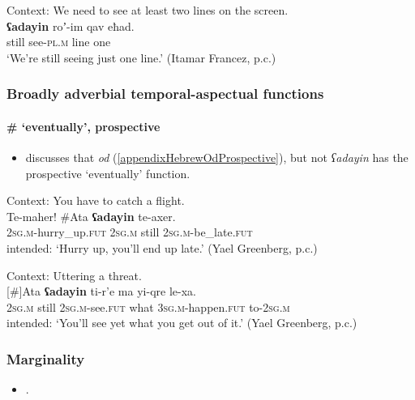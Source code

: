 \begin{exe}
	\ex\label{appendixHebrewAdayinScalar5}
	 Context: We need to see at least two lines on the screen.\\
	 \gll \textbf{ʕadayin} roʼ-im qav eħad.\\
	 still see-\textsc{pl}.\textsc{m} line one\\
	 \glt \lq We're still seeing just one line.\rq{ }(Itamar Francez, p.c.)
\end{exe}


\subsubsection{Broadly adverbial temporal-aspectual functions}
\paragraph{\# \lq eventually', prospective}

\begin{itemize}
	\item \textcite[141]{Koenig1991} discusses that \textit{od} (\ref{appendixHebrewOdProspective}), but not \textit{ʕadayin} has the prospective \lq eventually\rq{ }function. 
\end{itemize}

\begin{exe}
	\ex Context: You have to catch a flight.\\
	\gll Te-maher! \#Ata \textbf{ʕadayin} te-axer.\\
	2\textsc{sg}.\textsc{m}-hurry\_up.\textsc{fut} \phantom{\#}2\textsc{sg}.\textsc{m} still 2\textsc{sg}.\textsc{m}-be\_late.\textsc{fut}\\
	\glt intended: \lq Hurry up, you’ll end up late.' (Yael Greenberg, p.c.)
	
	\ex Context: Uttering a threat.\\
	\exi{}[\#]{\gll Ata \textbf{ʕadayin} ti-r’e ma yi-qre le-xa.\\
	2\textsc{sg}.\textsc{m} still 2\textsc{sg}.\textsc{m}-see.\textsc{fut} what 3\textsc{sg}.\textsc{m}-happen.\textsc{fut} to-2\textsc{sg}.\textsc{m}\\
	\glt intended: \lq You’ll see yet what you get out of it.' (Yael Greenberg, p.c.)}
\end{exe}

\subsubsection{Marginality}
\label{appendixHebrewAdayinMarginal}
\begin{itemize}
	\item \textcite{TsirkinSadan2019}.
\end{itemize}

